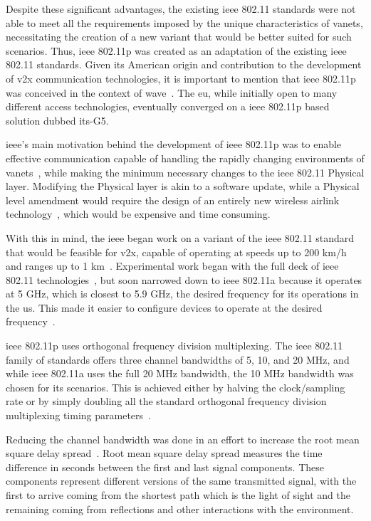 Despite these significant advantages, the existing \gls{ieee} 802.11 standards were not able to meet all the requirements imposed by the unique characteristics of \glspl{vanet}, necessitating the creation of a new variant that would be better suited for such scenarios. Thus, \gls{ieee} 802.11p was created as an adaptation of the existing \gls{ieee} 802.11 standards. Given its American origin and contribution to the development of \gls{v2x} communication technologies, it is important to mention that \gls{ieee} 802.11p was conceived in the context of \gls{wave}~\cite{jiang_ieee_2008}. The \gls{eu}, while initially open to many different access technologies, eventually converged on a \gls{ieee} 802.11p based solution dubbed \gls{its}-G5.

\gls{ieee}'s main motivation behind the development of \gls{ieee} 802.11p was to enable effective communication capable of handling the rapidly changing environments of \glspl{vanet}~\cite{jiang_ieee_2008}, while making the minimum necessary changes to the \gls{ieee} 802.11 Physical layer. Modifying the Physical layer is akin to a software update, while a Physical level amendment would require the design of an entirely new wireless airlink technology~\cite{jiang_ieee_2008}, which would be expensive and time consuming. 

With this in mind, the \gls{ieee} began work on a variant of the \gls{ieee} 802.11 standard that would be feasible for \gls{v2x}, capable of operating at speeds up to 200 km/h and ranges up to 1 km~\cite{jakubiak_state_2008}. Experimental work began with the full deck of \gls{ieee} 802.11 technologies~\cite{toor_vehicle_2008}, but soon narrowed down to \gls{ieee} 802.11a because it operates at 5 GHz, which is closest to 5.9 GHz, the desired frequency for \gls{its} operations in the \gls{us}. This made it easier to configure devices to operate at the desired frequency~\cite{jiang_ieee_2008}.


\gls{ieee} 802.11p uses orthogonal frequency division multiplexing. The \gls{ieee} 802.11 family of standards offers three channel bandwidths of 5, 10, and 20 MHz, and while \gls{ieee} 802.11a uses the full 20 MHz bandwidth, the 10 MHz bandwidth was chosen for \gls{its} scenarios. This is achieved either by halving the clock/sampling rate or by simply doubling all the standard orthogonal frequency division multiplexing timing parameters~\cite{rohde__schwarz_intelligent_2019}.

Reducing the channel bandwidth was done in an effort to increase the root mean square delay spread~\cite{toor_vehicle_2008}. Root mean square delay spread measures the time difference in seconds between the first and last signal components. These components represent different versions of the same transmitted signal, with the first to arrive coming from the shortest path which is the light of sight and the remaining coming from reflections and other interactions with the environment.

